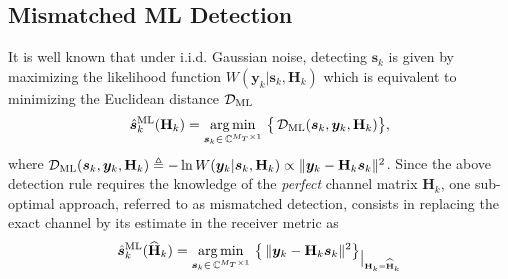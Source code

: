 \documentclass{article}
\def\W{,\thickspace}
\def\H{{\mathbf H}}
\def\HH{\widehat{{\mathbf H}}}
\def\y{{\bm y }}
\def\s{{\bm s }}
\def\W{{ W}}
\begin{document}
\subsection{Mismatched ML Detection}
\label{subsec:mis}
It is well known that under i.i.d. Gaussian noise, detecting $\s_k$ is given by maximizing the likelihood function $\W(\y_k|\s_k,\H_k)$ which is equivalent to minimizing the Euclidean distance $\mathcal{D}_{\rm ML}$
\begin{equation}
\label{eq:metric1}
\hat{\s}_k^{\rm ML}(\H_k)= \argmin_{\s_k \in \, \mathbb{C}^{M_T \times 1}}\, \big \{ \,\mathcal{D}_{\rm ML}(\s_k,\y_k,\H_k) \big \},
\end{equation}
where
$\mathcal{D}_{\rm ML}(\s_k,\y_k,\H_k) \triangleq - \ln \W(\y_k|\s_k,\H_k)\propto \|\y_k - \H_k \s_k \|^2$.
Since the above detection rule requires the knowledge of the {\it perfect} channel matrix $\H_k$, one sub-optimal approach, referred to as mismatched detection, consists in replacing the exact channel by its estimate in the receiver metric as
\begin{equation}
\label{eq:metric3}
\hat{\s}_k^{\rm ML}(\HH_k)= \argmin_{\s_k \in \, \mathbb{C}^{M_T \times 1}}\, \big \{ \,\|\y_k - \H_k \s_k \|^2 \big \}_{\big |_{\H_k=\HH_k} }
\end{equation}
\vspace{-4mm}
\end{document}
